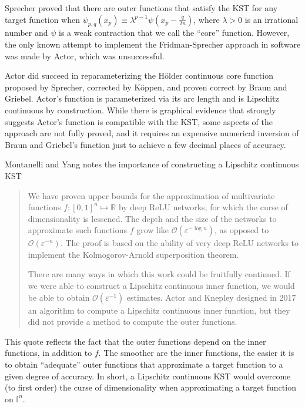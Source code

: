 Sprecher proved that there are outer functions that satisfy the KST for any target function when $\psi_{p,q}\left(x_p\right) \equiv \lambda^{p - 1} \psi\left(x_p - \frac{q}{2n}\right)$, where $\lambda > 0$ is an irrational number and $\psi$ is a weak contraction that we call the ``core'' function. However, the only known attempt to implement the Fridman-Sprecher approach in software was made by Actor, which was unsuccessful.

Actor did succeed in reparameterizing the H\"{o}lder continuous core function proposed by Sprecher, corrected by K\"{o}ppen, and proven correct by Braun and Griebel. Actor's function is parameterized via its arc length and is Lipschitz continuous by construction. While there is graphical evidence that strongly suggests Actor's function is compatible with the KST, some aspects of the approach are not fully proved, and it requires an expensive numerical inversion of Braun and Griebel's function just to achieve a few decimal places of accuracy.

Montanelli and Yang notes the importance of constructing a Lipschitz continuous KST
\begin{quote}
We have proven upper bounds for the approximation of multivariate functions $f : [0, 1]^n \mapsto \mathbb{R}$ by deep ReLU networks, for which the curse of dimensionality is lessened. The depth and the size of the networks to approximate such functions $f$ grow like $\mathcal{O}\left(\varepsilon^{-\log n}\right)$, as opposed to $\mathcal{O}\left(\varepsilon^{-n}\right)$. The proof is based on the ability of very deep ReLU networks to implement the Kolmogorov-Arnold superposition theorem.

There are many ways in which this work could be fruitfully continued. If we were able to construct a Lipschitz continuous inner function, we would be able to
obtain $\mathcal{O}\left(\varepsilon^{-1}\right)$ estimates. Actor and Knepley designed in 2017 an algorithm to compute a Lipschitz continuous inner function, but they did not provide a method to compute the outer functions.
\end{quote}
\noindent This quote reflects the fact that the outer functions depend on the inner functions, in addition to $f$. The smoother are the inner functions, the easier it is to obtain ``adequate'' outer functions that approximate a target function to a given degree of accuracy. In short, a Lipschitz continuous KST would overcome (to first order) the curse of dimensionality when approximating a target function on $\mathbb{I}^n$. 

